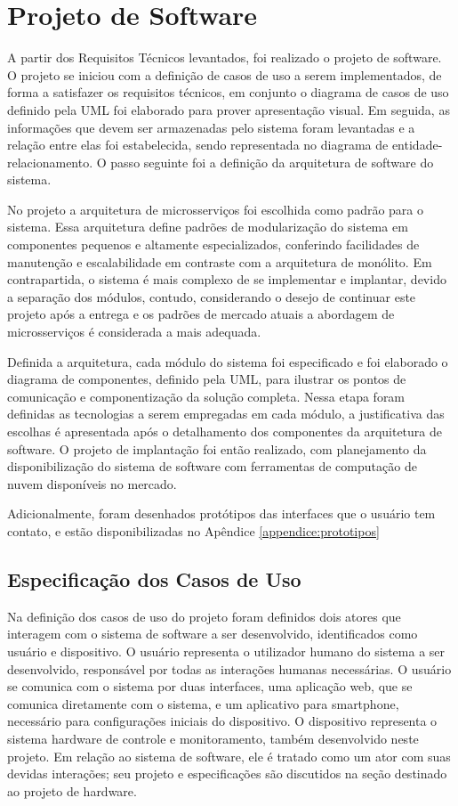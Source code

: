 \section{Projeto de Software}

A partir dos Requisitos Técnicos levantados, foi realizado o projeto de software. O projeto se iniciou com a definição de casos de uso a serem implementados, de forma a satisfazer os requisitos técnicos, em conjunto o diagrama de casos de uso definido pela UML foi elaborado para prover apresentação visual. Em seguida, as informações que devem ser armazenadas pelo sistema foram levantadas e a relação entre elas foi estabelecida, sendo representada no diagrama de entidade-relacionamento. O passo seguinte foi a definição da arquitetura de software do sistema.

No projeto a arquitetura de microsserviços foi escolhida como padrão para o sistema. Essa arquitetura define padrões de modularização do sistema em componentes pequenos e altamente especializados, conferindo facilidades de manutenção e escalabilidade em contraste com a arquitetura de monólito. Em contrapartida, o sistema é mais complexo de se implementar e implantar, devido a separação dos módulos, contudo, considerando o desejo de continuar este projeto após a entrega e os padrões de mercado atuais a abordagem de microsserviços é considerada a mais adequada. 

Definida a arquitetura, cada módulo do sistema foi especificado e foi elaborado o diagrama de componentes, definido pela UML, para ilustrar os pontos de comunicação e componentização da solução completa. Nessa etapa foram definidas as tecnologias a serem empregadas em cada módulo, a justificativa das escolhas é apresentada após o detalhamento dos componentes da arquitetura de software. O projeto de implantação foi então realizado, com planejamento da disponibilização do sistema de software com ferramentas de computação de nuvem disponíveis no mercado.

Adicionalmente, foram desenhados protótipos das interfaces que o usuário tem contato, e estão disponibilizadas no Apêndice \ref{appendice:prototipos}

\subsection{Especificação dos Casos de Uso}

Na definição dos casos de uso do projeto foram definidos dois atores que interagem com o sistema de software a ser desenvolvido, identificados como 
usuário e dispositivo. O usuário representa o utilizador humano do sistema a ser desenvolvido, responsável por todas as interações humanas necessárias. 
O usuário se comunica com o sistema por duas interfaces, uma aplicação web, que se comunica diretamente com o sistema, e um aplicativo para smartphone, necessário para configurações iniciais do dispositivo. O dispositivo representa o sistema hardware de controle e monitoramento, também desenvolvido neste projeto. Em relação ao sistema de software, ele é tratado como um ator com suas devidas interações; seu projeto e especificações são discutidos na seção destinado ao projeto de hardware.

